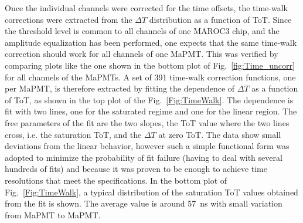 \documentclass[5p,times,twocolumn]{elsarticle}
\begin{document}
Once the individual channels were corrected for the time offsets, the time-walk corrections were extracted from
the $\Delta T$ distribution as a function of ToT. Since the threshold level is common to all channels of one MAROC3
chip, and the amplitude equalization has been performed, one expects that the same time-walk correction should work
for all channels of one MaPMT. This was verified by comparing plots like the one shown in the bottom plot of
Fig.~\ref{fig:Time_uncorr} for all channels of the MaPMTs. A set of 391 time-walk correction functions, one
per MaPMT, is therefore extracted by fitting the dependence of $\Delta T$ as a function of ToT, as shown in the
top plot of the Fig.~\ref{Fig:TimeWalk}. The dependence is fit with two lines, one for the saturated regime and
one for the linear region. The free parameters of the fit are the two slopes, the ToT value where the two lines cross,
i.e. the saturation ToT, and the $\Delta T$ at zero ToT. The data show small deviations from the linear behavior,
however such a simple functional form was adopted to minimize the probability of fit failure (having to deal with
several hundreds of fits) and because it was proven to be enough to achieve time resolutions that meet the
specifications. In the bottom plot of Fig.~\ref{Fig:TimeWalk}, a typical distribution of the saturation ToT values
obtained from the fit is shown. The average value is around 57~ns with small variation from MaPMT to MaPMT.
\end{document}
